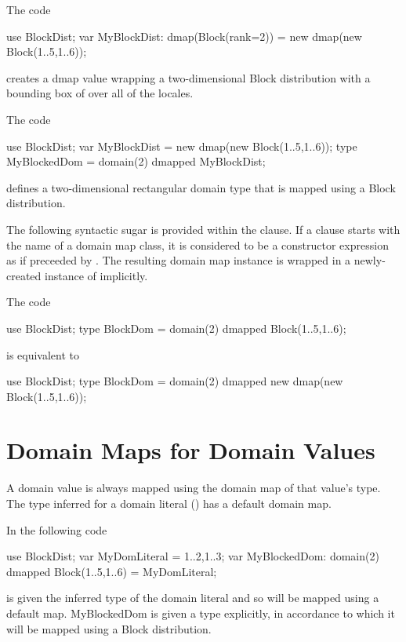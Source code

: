 \begin{example}
The code
\begin{chapel}
use BlockDist;
var MyBlockDist: dmap(Block(rank=2)) = new dmap(new Block({1..5,1..6}));
\end{chapel}
creates a dmap value wrapping a two-dimensional Block distribution with a
bounding box of  over all of the locales.
\end{example}

\begin{example}
The code
\begin{chapel}
use BlockDist;
var MyBlockDist = new dmap(new Block({1..5,1..6}));
type MyBlockedDom = domain(2) dmapped MyBlockDist;
\end{chapel}
defines a two-dimensional rectangular domain type
that is mapped using a Block distribution.
\end{example}

The following syntactic sugar is provided within the  clause.
If a  clause starts with the name of a domain map class,
it is considered to be a constructor expression as if preceeded by
. The resulting domain map instance is wrapped in a newly-created
instance of  implicitly.

\begin{example}
The code
\begin{chapel}
use BlockDist;
type BlockDom = domain(2) dmapped Block({1..5,1..6});
\end{chapel}
is equivalent to
\begin{chapel}
use BlockDist;
type BlockDom = domain(2) dmapped new dmap(new Block({1..5,1..6}));
\end{chapel}
\end{example}


\section{Domain Maps for Domain Values}
\label{Domain_Maps_For_Values}

A domain value is always mapped using the domain map of that value's type.
The type inferred for a domain literal ()
has a default domain map.

\begin{example}
In the following code
\begin{chapel}
use BlockDist;
var MyDomLiteral = {1..2,1..3};
var MyBlockedDom: domain(2) dmapped Block({1..5,1..6}) = MyDomLiteral;
\end{chapel}
 is given the inferred type of the domain literal
and so will be mapped using a default map.
MyBlockedDom is given a type explicitly, in accordance to which
it will be mapped using a Block distribution.
\end{example}

